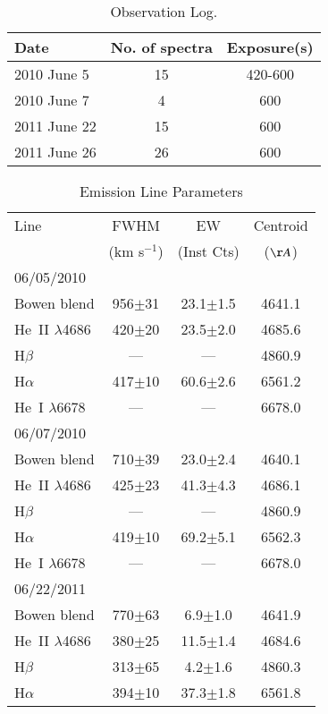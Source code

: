 \documentclass{aa}
\begin{document}
\begin{table}
      \caption{Observation Log.}
         \label{tab1}
         \begin{tabular}{lcc}
            \noalign{\smallskip}
            Date      &  No. of spectra & Exposure(s)  \\
            \hline
            2010 June 5 & 15 &   420-600  \\
	    2010 June 7 &  4 & 600\\
	    2011 June 22 & 15& 600\\
	    2011 June 26&26& 600\\
            \hline
         \end{tabular}
   \end{table}


%
 \begin{table}
      \caption{Emission Line Parameters}
         \label{tab2}
         \begin{tabular}{lccc}
            \hline
            Line      &  FWHM & EW&Centroid \\
		 & (km s$^{-1}$)&(Inst Cts)&($\AA$)\\
            \hline
06/05/2010&&&\\
		Bowen blend &956$\pm$31&23.1$\pm$1.5&4641.1\\
		He~II $\lambda$4686 &420$\pm$20&23.5$\pm$2.0&4685.6\\
		H$\beta$&---&---&4860.9\\
		H$\alpha$&417$\pm$10&60.6$\pm$2.6&6561.2\\
		He~I $\lambda$6678&---&---&6678.0\\
\hline
06/07/2010&&&\\
                Bowen blend &710$\pm$39&23.0$\pm$2.4&4640.1\\
                He~II $\lambda$4686 &425$\pm$23&41.3$\pm$4.3&4686.1\\
                H$\beta$&---&---&4860.9\\
                H$\alpha$&419$\pm$10&69.2$\pm$5.1&6562.3\\
                He~I $\lambda$6678&---&---&6678.0\\
\hline
06/22/2011&&&\\ 
                Bowen blend &770$\pm$63&6.9$\pm$1.0&4641.9\\
                He~II $\lambda$4686 &380$\pm$25&11.5$\pm$1.4&4684.6\\
                H$\beta$&313$\pm$65&4.2$\pm$1.6&4860.3\\
                H$\alpha$&394$\pm$10&37.3$\pm$1.8&6561.8\\

\end{tabular}
\end{table}
\end{document}
